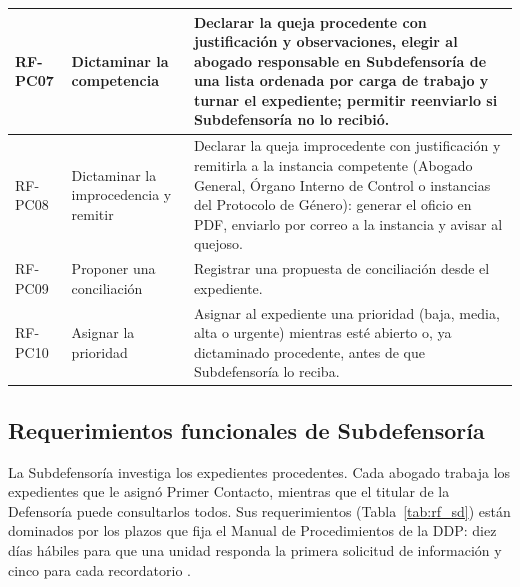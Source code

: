 \begin{longtable}{|L{1.7cm}|L{4.0cm}|L{9.9cm}|}
		RF-PC07 & Dictaminar la competencia & Declarar la queja procedente con justificación y
		observaciones, elegir al abogado responsable en Subdefensoría de una lista ordenada por carga
		de trabajo y turnar el expediente; permitir reenviarlo si Subdefensoría no lo recibió.
		\\ \hline

		RF-PC08 & Dictaminar la improcedencia y remitir & Declarar la queja improcedente con
		justificación y remitirla a la instancia competente (Abogado General, Órgano Interno de
		Control o instancias del Protocolo de Género): generar el oficio en PDF, enviarlo por correo
		a la instancia y avisar al quejoso. \\ \hline

		RF-PC09 & Proponer una conciliación & Registrar una propuesta de conciliación desde el
		expediente. \\ \hline

		RF-PC10 & Asignar la prioridad & Asignar al expediente una prioridad (baja, media, alta o
		urgente) mientras esté abierto o, ya dictaminado procedente, antes de que Subdefensoría lo
		reciba. \\ \hline
	\end{longtable}

	\normalsize

	\subsection{Requerimientos funcionales de Subdefensoría}
	La Subdefensoría investiga los expedientes procedentes. Cada abogado trabaja los expedientes que
	le asignó Primer Contacto, mientras que el titular de la Defensoría puede consultarlos todos.
	Sus requerimientos (Tabla~\ref{tab:rf_sd}) están dominados por los plazos que fija el Manual de
	Procedimientos de la DDP: diez días hábiles para que una unidad responda la primera solicitud de
	información y cinco para cada recordatorio \cite{ipn_manual_procedimientos_ddp}.

	\small
	\renewcommand{\arraystretch}{1.2}

